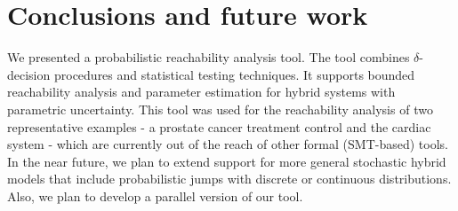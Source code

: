 \section{Conclusions and future work}
\vspace{-.4cm}
We presented a probabilistic reachability analysis tool. The tool combines $\delta$-decision 
procedures \cite{gao2013dreal, gao2013satisfiability, gaodelta} and statistical testing techniques. 
It supports bounded reachability analysis and parameter estimation for hybrid systems with parametric 
uncertainty. This tool was used for the reachability analysis of two representative examples - a prostate 
cancer treatment control and the cardiac system - which are currently out of the reach of other formal
(SMT-based) tools. In the near future, we plan to extend support for more general stochastic hybrid models 
that include probabilistic jumps with discrete or continuous distributions. Also, we plan to develop
a parallel version of our tool.
